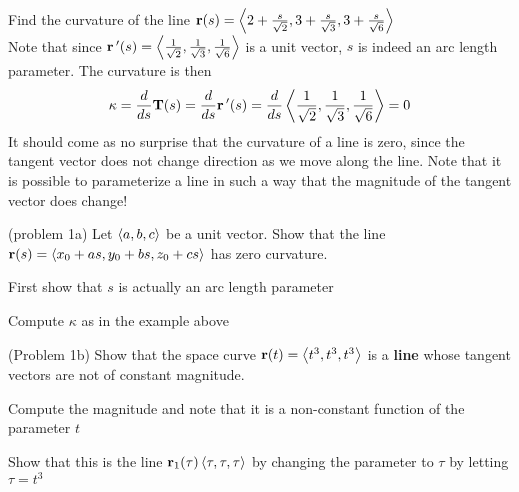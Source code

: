 \documentclass[handout]{ximera}
\begin{document}
\begin{example}[example 1]
Find the curvature of the line $\mathbf r(s) = \left\langle 2 + \frac{s}{\sqrt 2}, 3 + \frac{s}{\sqrt 3}, 3+ \frac{s}{\sqrt 6}\right\rangle$\\
Note that since $\mathbf r\,'(s) = \left\langle \frac{1}{\sqrt 2}, \frac{1}{\sqrt 3}, \frac{1}{\sqrt 6}\right\rangle$ is a unit vector, $s$ is indeed an arc length parameter.
The curvature is then
\[
\kappa = \frac{d}{ds} \mathbf T(s) = \frac{d}{ds} \mathbf r\,'(s) = \frac{d}{ds}\left\langle \frac{1}{\sqrt 2}, \frac{1}{\sqrt 3}, \frac{1}{\sqrt 6}\right\rangle = 0
\]
It should come as no surprise that the curvature of a line is zero, since the tangent vector does not change direction as we move along the line.
Note that it is possible to parameterize a line in such a way that the magnitude of the tangent vector does change! 
\end{example}

\begin{problem}(problem 1a)
Let $\left\langle a, b, c\right\rangle$ be a unit vector.  Show that the line $\mathbf r(s) = \left\langle x_0 + as, y_0 + bs, z_0 + cs\right\rangle$ has zero curvature.
\begin{hint}
First show that $s$ is actually an arc length parameter
\end{hint}
\begin{hint}
Compute $\kappa$ as in the example above
\end{hint}
\end{problem}

\begin{problem}(Problem 1b)
Show that the space curve $\mathbf r(t) = \left\langle t^3, t^3, t^3\right\rangle$ is a \textbf{line} whose tangent vectors are not of constant magnitude.\\
\begin{hint}
Compute the magnitude and note that it is a non-constant function of the parameter $t$
\end{hint}
\begin{hint}
Show that this is the line $\mathbf r_1(\tau) \left\langle \tau, \tau, \tau\right\rangle$ by changing the parameter to $\tau$ by letting $\tau = t^3$
\end{hint}
\end{problem}
\end{document}
